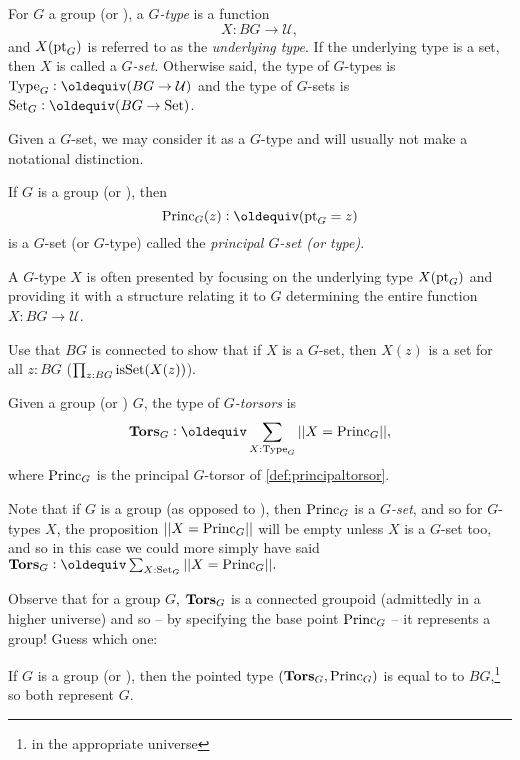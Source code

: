\begin{definition}
  For $G$ a group (or \inftygp), a \emph{$G$-type} is a function
  $$X\colon BG\to\mathcal U,$$
and $X({\mathord{\mathrm{pt}}}_G)$ is referred to as the \emph{underlying type}.
If the underlying type is a set, then $X$ is called a \emph{$G$-set}.
Otherwise said, the type of $G$-types is $\Type_G\defequi(BG\to\mathcal U)$ and the type of $G$-sets is $\Set_G\defequi(BG\to\Set)$.
\end{definition}
Given a $G$-set, we may consider it as a $G$-type and will usually not make a notational distinction.

\begin{example}\label{def:principaltorsor}
  If $G$ is a group (or \inftygp), then
$$\princ_G(z)\defequi(\pt_G=z)$$ is a $G$-set (or $G$-type) called the \emph{principal $G$-set (or type)}.
\end{example}

\begin{remark}
  A $G$-type $X$ is often presented by focusing on the underlying type $X({\mathord{\mathrm{pt}}}_G)$  and providing it with a structure relating it to $G$ determining the entire function $X\colon BG\to\mathcal U$.
\end{remark}

\begin{xca}
  Use that $BG$ is connected to show that if $X$ is a $G$-set, then $X(z)$ is a set for all $z:BG$ (\ie $\prod_{z:BG}\mathrm{isSet}(X(z))$).
\end{xca}
\begin{definition}
  Given a group (or \inftygp) $G$, the type of {\em$G$-torsors} is
$$\typetorsor_G\defequi\sum_{X:\Type_G}||X=\princ_G||,$$
where $\mathrm{Princ}_G$ is the principal $G$-torsor of \cref{def:principaltorsor}.
\end{definition}
\begin{remark}
  Note that if $G$ is a group (as opposed to \aninftygp), then $\mathrm{Princ}_G$ is a $G${\em-set}, and so for $G$-types $X$, the proposition $||X=\mathrm{Princ}_G||$ will be empty unless $X$ is a $G$-set too, and so in this case we could more simply have said $\typetorsor_G\defequi\sum_{X:\Set_G}||X=\princ_G||.$  

Observe that for a group $G$, $\mathbf{Tors}_G$ is a connected groupoid (admittedly in a higher universe) and so -- by specifying the base point $\mathrm{Princ}_G$ -- it represents a group!  Guess which one:
\end{remark}
\begin{lemma}
  If $G$ is a group (or \inftygp), then the pointed type $(\mathbf{Tors}_G,\mathrm{Princ}_G)$ is equal to to $BG$,\footnote{in the appropriate universe} so both represent $G$.
\end{lemma}

